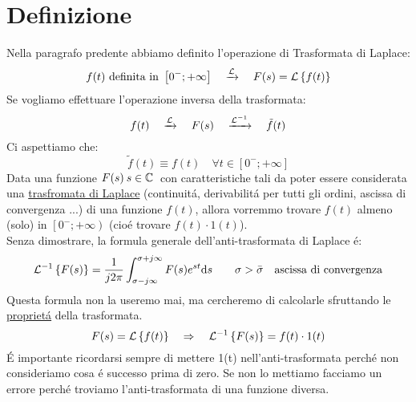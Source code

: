 \documentclass[../main.tex]{subfiles}
\begin{document}
	\section{Definizione}
	Nella paragrafo predente abbiamo definito l'operazione di Trasformata di Laplace:
	$$\Lapl{f(t)\ \text{definita in}\ \left[ 0^-;+\infty \right]}{F(s)=\Lbrace{f(t)}}  $$
	Se vogliamo effettuare l'operazione inversa della trasformata:
	$$ f(t) \quad \xrightarrow{\mathcal{L}} \quad F(s)  \quad \xrightarrow{\mathcal{L}^{-1}} \quad  \tilde{f}(t) $$
	Ci aspettiamo che: 
	$$ \tilde{f}(t) \equiv f(t) \quad \forall t \in \left[ 0^-;+\infty \right] $$
	\linebreak
	Data una funzione $ F(s)\: s \in \mathbb{C}\: $ con caratteristiche tali da poter essere considerata una \hyperref[sec:trasformata_laplace]{trasfromata di Laplace} (continuit\'{a}, derivabilit\'{a} per tutti gli ordini, ascissa di convergenza ...) di una funzione $ f(t) $, allora vorremmo trovare $ f(t) $ almeno (solo) in $ \left[ 0^-;+\infty \right) $ (cio\'{e} trovare $ f(t) \cdot 1(t) $).\\
	\linebreak
	Senza dimostrare, la formula generale dell'anti-trasformata di Laplace \'{e}:
	\[ \mathcal{L}^{-1} \left\lbrace F(s) \right\rbrace = \frac{1}{j2\pi} \int_{ \sigma - j \infty }^{ \sigma + j \infty } F(s) e^{st} \mathrm{d}s \qquad \sigma > \bar{\sigma} \quad \text{ascissa di convergenza} \]
	Questa formula non la useremo mai, ma cercheremo di calcolarle sfruttando le \hyperref[subsec:prop_laplace]{propriet\'{a}} della trasformata.
	\[ F(s) = \mathcal{L} \left\lbrace f(t) \right\rbrace \quad \Rightarrow \quad \mathcal{L}^{-1} \left\lbrace F(s) \right\rbrace = f(t) \cdot 1(t) \]
	\'{E} importante ricordarsi sempre di mettere 1(t) nell'anti-trasformata perch\'{e} non consideriamo cosa \'{e} successo prima di zero. Se non lo mettiamo facciamo un errore perch\'{e} troviamo l'anti-trasformata di una funzione diversa. 
\end{document}
